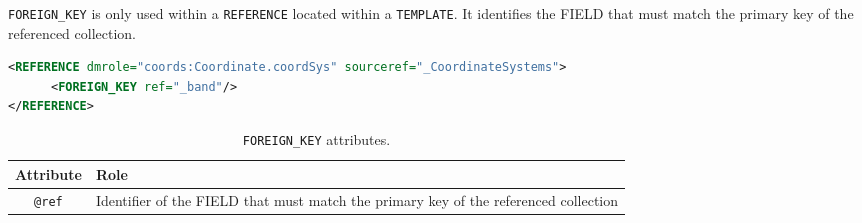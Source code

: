 \texttt{FOREIGN\_KEY} is only used within a \texttt{REFERENCE} located within a \texttt{TEMPLATE}.
It identifies the FIELD that must  match the primary key of the referenced collection.

\begin{lstlisting}[caption={The \texttt{REFERENCE} is resolved by the \texttt{INSTANCE} of table \_CoordinateSystems that has a primary key equals to the value of the column  \_band.},language=XML]
<REFERENCE dmrole="coords:Coordinate.coordSys" sourceref="_CoordinateSystems">
      <FOREIGN_KEY ref="_band"/>
</REFERENCE>
\end{lstlisting}

\begin{table}[!htbp]
\small
\centering
\begin{tabulary}{\linewidth}{|c|J|}       
       \hline 
            \textbf{Attribute} & 
            \textbf {Role}\\
       \hline         \hline  
             \texttt{@ref} &
             Identifier of the FIELD that must  match the primary key of the referenced collection \\
     \hline
     \end{tabulary}
     \caption{\texttt{FOREIGN\_KEY} attributes.} 
     \label{tbl:foreignkey-att}
 \end{table}
